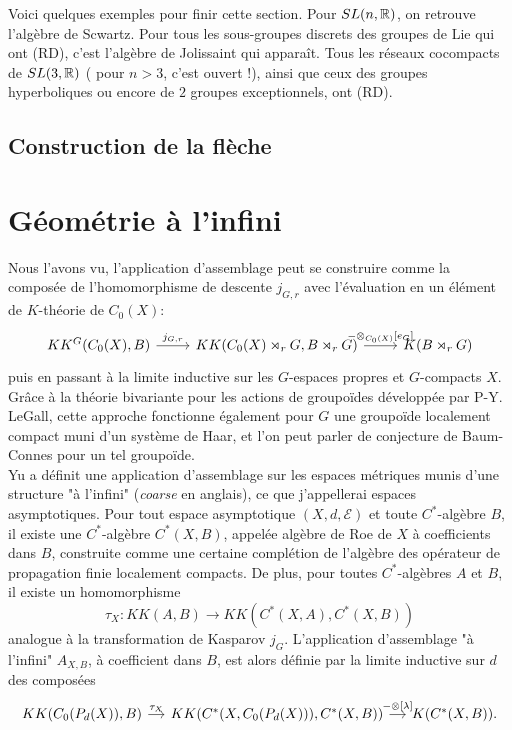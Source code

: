 Voici quelques exemples pour finir cette section. Pour $SL(n,\mathbb R)$, on retrouve l'algèbre de Scwartz. Pour tous les sous-groupes discrets des groupes de Lie qui ont (RD), c'est l'algèbre de Jolissaint qui apparaît. Tous les réseaux cocompacts de $SL(3,\mathbb R)$ ( pour $n> 3$, c'est ouvert !), ainsi que ceux des groupes hyperboliques ou encore de $2$ groupes exceptionnels, ont (RD).  

\subsection{Construction de la flèche}
\section{Géométrie à l'infini}

Nous l'avons vu, l'application d'assemblage peut se construire comme la composée de l'homomorphisme de descente $j_{G,r}$ avec l'évaluation en un élément de $K$-théorie de $C_0(X)$:
\[\begin{tikzcd}
KK^G(C_0(X),B)\arrow{r}{j_{G,r}}& KK(C_0(X)\rtimes_r G,B \rtimes_r G) \arrow{r}{-\otimes_{C_0(X)} [e_G]} & K(B\rtimes_r G) 
\end{tikzcd}\]
puis en passant à la limite inductive sur les $G$-espaces propres et $G$-compacts $X$. Grâce à la théorie bivariante pour les actions de groupoïdes développée par P-Y. LeGall, cette approche fonctionne également pour $G$ une groupoïde localement compact muni d'un système de Haar, et l'on peut parler de conjecture de Baum-Connes pour un tel groupoïde.  \\

Yu a définit une application d'assemblage sur les espaces métriques munis d'une structure "à l'infini" (\textit{coarse} en anglais), ce que j'appellerai espaces asymptotiques. Pour tout espace asymptotique $(X,d,\mathcal E)$ et toute $C^*$-algèbre $B$, il existe une $C^*$-algèbre $C^*(X,B)$, appelée algèbre de Roe de $X$ à coefficients dans $B$, construite comme une certaine complétion de l'algèbre des opérateur de propagation finie localement compacts. De plus, pour toutes $C^*$-algèbres $A$ et $B$, il existe un homomorphisme
\[\tau_X : KK(A,B)\rightarrow KK(C^*(X,A),C^*(X,B))\]
analogue à la transformation de Kasparov $j_G$. L'application d'assemblage "à l'infini" $A_{X,B}$, à coefficient dans $B$, est alors définie par la limite inductive sur $d$ des composées
\[\begin{tikzcd}[column sep= small]
KK(C_0(P_d(X)),B)\arrow{r}{\tau_X}& KK(C^*(X,C_0(P_d(X))),C^*(X,B)) \arrow{r}{-\otimes [\lambda]} & K(C^*(X,B)) .
\end{tikzcd}\]

